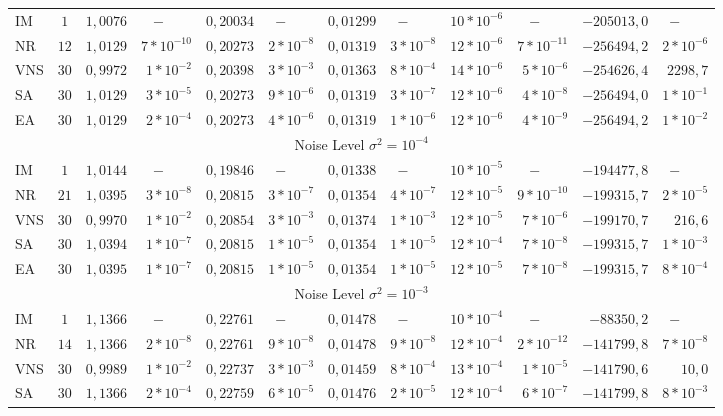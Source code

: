 \documentclass{sig-alternate}
\begin{document}
{\begin{table}
\begin{center}
{\begin{tabular}{lc|rrrrrrrrrr}
\hline
IM 		& $1$ 	&$1,0076$&$-\qquad$      	    & $0,20034$&$-\qquad$      	&$0,01299$&$-\qquad$    	    &$10*10^{-6}$&$-\qquad$	&$-205013,0$	&$-\qquad$\\
NR		& $12$	&$1,0129$ & $7*10^{-10}$	& $0,20273$&$2*10^{-8}$	&$0,01319$ &$3*10^{-8}$	&$12*10^{-6}$&$7*10^{-11}$	&$-256494,2$	&$2*10^{-6}$	 \\
VNS  	& $30$  &$0,9972$&$1*10^{-2}$    & $0,20398$&$3*10^{-3}$  	&$0,01363$&$8*10^{-4}$  	&$14*10^{-6}$&$5*10^{-6}$	&$-254626,4$	&$2298,7$	 \\
SA 		& $30$  &$1,0129$&$3*10^{-5}$ 	& $0,20273$&$9*10^{-6}$  	&$0,01319$&$3*10^{-7}$ 	&$12*10^{-6}$&$4*10^{-8}$	&$-256494,0$	&$1*10^{-1}$	 \\
EA 		& $30$  &$1,0129$&$2*10^{-4}$		& $0,20273$&$4*10^{-6}$  	&$0,01319$&$1*10^{-6}$ 	&$12*10^{-6}$&$4*10^{-9}$	&$-256494,2$	&$1*10^{-2}$\\
\hline
\multicolumn{12}{c}{Noise Level $\sigma^2=10^{-4}$} \\
\hline
IM 		&$1$	&$1,0144$&$-\qquad$           & $0,19846$&$-\qquad$         &$0,01338$&$-\qquad$      &$10*10^{-5}$&$-\qquad$	& $-194477,8$&$-\qquad$			 \\
NR 	&$21$	&$1,0395$&$3*10^{-8}$     &  $0,20815$&$3*10^{-7}$  &$0,01354$&$4*10^{-7}$  &$12*10^{-5}$&$9*10^{-10}$	& $-199315,7$&$2*10^{-5}$\\
VNS		&$30$	&$0,9970$&$1*10^{-2}$     & $0,20854$&$3*10^{-3}$   &$0,01374$&$1*10^{-3}$  &$12*10^{-5}$&$7*10^{-6}$	& $-199170,7$&$216,6$\\
SA 		&$30$	&$1,0394$&$1*10^{-7}$     & $0,20815$&$1*10^{-5}$   &$0,01354$&$1*10^{-5}$	&$12*10^{-4}$&$7*10^{-8}$	& $-199315,7$&$1*10^{-3}$\\
EA 		&$30$	&$1,0395$&$1*10^{-7}$     & $0,20815$&$1*10^{-5}$   &$0,01354 $&$1*10^{-5}$ &$12*10^{-5}$&$7*10^{-8}$	& $-199315,7$&$8*10^{-4}$\\
\hline
\multicolumn{12}{c}{Noise Level $\sigma^2=10^{-3}$} \\
\hline
IM 		&$1$ 	&$1,1366$	&$-\qquad$    	&$0,22761$	&$-\qquad$    	&$0,01478$	&$-\qquad$    	&$10*10^{-4}$&$-\qquad$	& $-88350,2$	&$-\qquad$\\
NR 	&$14$	&$1,1366$	&$2*10^{-8}$	&$0,22761$	&$9*10^{-8}$	&$0,01478$	&$9*10^{-8}$ 	&$12*10^{-4}$&$2*10^{-12}$	& $-141799,8 $	&$7*10^{-8}$\\
VNS 	&$30$	&$0,9989$	&$1*10^{-2}$	&$0,22737$	&$3*10^{-3}$	&$0,01459$	&$8*10^{-4}$	&$13*10^{-4}$&$1*10^{-5}$	& $-141790,6$	&$10,0$\\
SA 		&$30$	&$1,1366$	&$2*10^{-4}$	&$0,22759$	&$6*10^{-5}$	&$0,01476$	&$2*10^{-5}$ 	&$12*10^{-4}$&$6*10^{-7}$	& $-141799,8 $&$8*10^{-3}$\\

\end{tabular}}
\end{center}
\end{table}}
\end{document}
